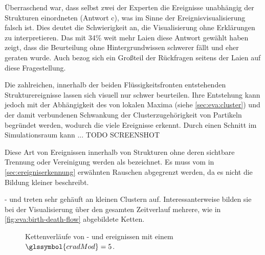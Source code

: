 Überraschend war, dass selbst zwei der Experten die Ereignisse unabhängig der Strukturen einordneten (Antwort c), was im Sinne der Ereignisvisualisierung falsch ist. Dies deutet die Schwierigkeit an, die Visualisierung ohne Erklärungen zu interpretieren. Das mit 34\% weit mehr Laien diese Antwort gewählt haben zeigt, dass die Beurteilung ohne Hintergrundwissen schwerer fällt und eher geraten wurde. Auch bezog sich ein Großteil der Rückfragen seitens der Laien auf diese Fragestellung.

Die zahlreichen, innerhalb der beiden Flüssigkeitsfronten entstehenden Strukturereignisse lassen sich visuell nur schwer beurteilen. Ihre Entstehung kann jedoch mit der Abhängigkeit des \CFD von lokalen Maxima (siehe \autoref{sec:eva:cluster}) und der damit verbundenen Schwankung der Clusterzugehörigkeit von Partikeln begründet werden, wodurch die  viele Ereignisse erkennt. Durch einen Schnitt im Simulationsraum kann ... TODO SCREENSHOT

Diese Art von Ereignissen innerhalb von Strukturen ohne deren sichtbare Trennung oder Vereinigung werden als  bezeichnet. Es muss vom in \autoref{sec:ereigniserkennung} erwähnten Rauschen abgegrenzt werden, da es nicht die Bildung kleiner  beschreibt.

- und  treten sehr gehäuft an kleinen Clustern auf. Interessanterweise bilden sie bei der Visualisierung über den gesamten Zeitverlauf mehrere, wie in \autoref{fig:eva:birth-death-flow} abgebildete Ketten.

\begin{figure}
	{\caption{Kettenverläufe von - und ereignissen mit einem  $\glssymbol{cradMod} = 5$.}\label{fig:eva:birth-death-flow}}
\end{figure}

